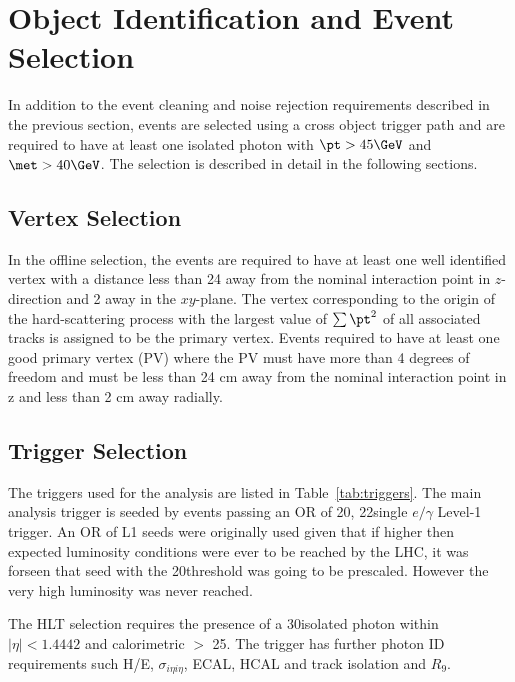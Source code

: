 
\section{Object Identification and Event Selection}

In addition to the event cleaning and noise rejection requirements described in the previous section, events are selected using a cross object trigger path and are required to have at least one isolated photon with $\pt > 45 \GeV$ and $\met > 40 \GeV$. The selection is described in detail in the following sections.

\subsection{Vertex Selection}

 In the offline selection, the events are required to have at least one well identified vertex with a distance less than 24 \cm away from the nominal interaction point in $z$-direction and 2 \cm away in the $xy$-plane. The vertex corresponding to the origin of the hard-scattering process with the largest value of $\sum \pt^2$ of all associated tracks is assigned to be the primary vertex. Events required to have at least one good primary vertex (PV) where the PV must have more than 4 degrees of freedom and must be less than 24 cm away from the nominal interaction point in z and less than 2 cm away radially.

                                     
\subsection{Trigger Selection}
\label{sec:trig}

The triggers used for the analysis are listed in Table~\ref{tab:triggers}. The main analysis trigger is seeded by events passing an OR of 20\GeV, 22\GeV single $e/\gamma$ Level-1 trigger. An OR of L1 seeds were originally used given that if higher then expected luminosity conditions were ever to be reached by the LHC, it was forseen that seed with the 20\GeV threshold was going to be prescaled. However the very high luminosity was never reached. 

The HLT selection requires the presence of a 30\GeV isolated photon within $|\eta|<1.4442$ and calorimetric \met $>$ 25\GeV. The trigger has further photon ID requirements such  H/E,  $\sigma_{i{\eta}i{\eta}}$, ECAL, HCAL and track isolation and $R_9$.

